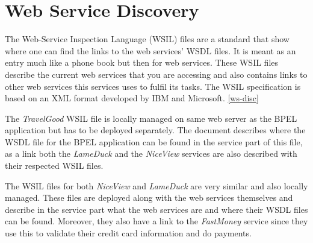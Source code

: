 \section{Web Service Discovery}
The Web-Service Inspection Language (WSIL) files are a standard that show where one can find the links to the web services’ WSDL files. It is meant as an entry much like a phone book but then for web services. These WSIL files describe the current web services that you are accessing and also contains links to other web services this services uses to fulfil its tasks. The WSIL specification is based on an XML format developed by IBM and Microsoft. \ref{ws-disc}

The \textit{TravelGood} WSIL file is locally managed on same web server as the BPEL application but has to be deployed separately. The document describes where the WSDL file for the BPEL application can be found in the service part of this file, as a link both the \textit{LameDuck} and the \textit{NiceView} services are also described with their respected WSIL files. 

The WSIL files for both \textit{NiceView} and \textit{LameDuck} are very similar and also locally managed. These files are deployed along with the web services themselves and describe in the service part what the web services are and where their WSDL files can be found. Moreover, they also have a link to the \textit{FastMoney} service since they use this to validate their credit card information and do payments.